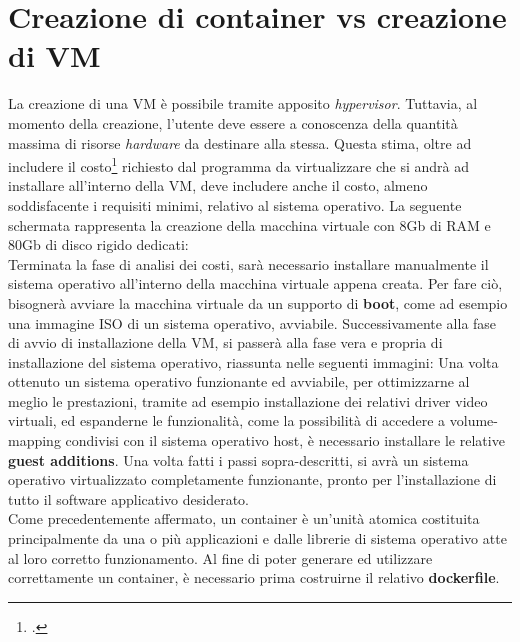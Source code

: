 \section{Creazione di container vs creazione di VM}

La creazione di una VM è possibile tramite apposito \textit{hypervisor}. Tuttavia, al momento della creazione, l'utente deve essere a conoscenza della quantità massima di risorse \textit{hardware} da destinare alla stessa. Questa stima, oltre ad includere il costo\footcite{inteso come quantitativo di risorse fisiche da allocare} richiesto dal programma da virtualizzare che si andrà ad installare all'interno della VM, deve includere anche il costo, almeno soddisfacente i requisiti minimi, relativo al sistema operativo. 
La seguente schermata rappresenta la creazione della macchina virtuale con 8Gb di RAM e 80Gb di disco rigido dedicati:\\
Terminata la fase di analisi dei costi, sarà necessario installare manualmente il sistema operativo all'interno della macchina virtuale appena creata. Per fare ciò, bisognerà avviare la macchina virtuale da un supporto di \textbf{boot}, come ad esempio una immagine \gls{ISO} di un sistema operativo, avviabile.
Successivamente alla fase di avvio di installazione della VM, si passerà alla fase vera e propria di installazione del sistema operativo, riassunta nelle seguenti immagini:
Una volta ottenuto un sistema operativo funzionante ed avviabile, per ottimizzarne al meglio le prestazioni, tramite ad esempio installazione dei relativi \gls{driver} video virtuali, ed espanderne le funzionalità, come la possibilità di accedere a volume-mapping condivisi con il sistema operativo host, è necessario installare le relative \textbf{\gls{guest additions}}.
Una volta fatti i passi sopra-descritti, si avrà un sistema operativo virtualizzato completamente funzionante, pronto per l'installazione di tutto il software applicativo desiderato.
\\
Come precedentemente affermato, un container è un'unità atomica costituita principalmente da una o più applicazioni e dalle librerie di sistema operativo atte al loro corretto funzionamento.
Al fine di poter generare ed utilizzare correttamente un container, è necessario prima costruirne il relativo \textbf{\gls{dockerfile}}.
